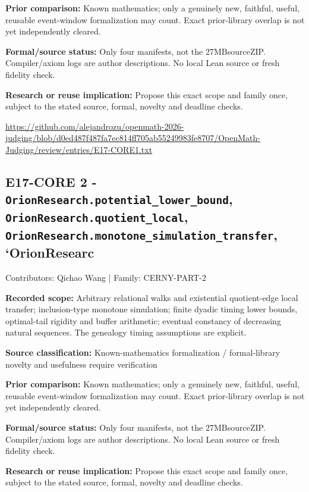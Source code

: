 \documentclass[11pt,a4paper]{article}
\begin{document}
\textbf{Prior comparison:} Known mathematics; only a genuinely new, faithful, useful, reusable event-window formalization may count. Exact prior-library overlap is not yet independently cleared.

\textbf{Formal/source status:} Only four manifests, not the 27MBsourceZIP. Compiler/axiom logs are author descriptions. No local Lean source or fresh fidelity check.

\textbf{Research or reuse implication:} Propose this exact scope and family once, subject to the stated source, formal, novelty and deadline checks.

{\small \url{https://github.com/alejandrozu/openmath-2026-judging/blob/d0ed487f487fa7ec814ff705ab55249983fe8707/OpenMath-Judging/review/entries/E17-CORE1.txt}\par}

\begin{samepage}
\subsection{E17-CORE 2  -  \texttt{OrionResearch.potential\_lower\_bound}, \texttt{OrionResearch.quotient\_local}, \texttt{OrionResearch.monotone\_simulation\_transfer}, `OrionResearc}
{\small Contributors: Qichao Wang | Family: CERNY-PART-2\par}

\textbf{Recorded scope:} Arbitrary relational walks and existential quotient-edge local transfer; inclusion-type monotone simulation; finite dyadic timing lower bounds, optimal-tail rigidity and buffer arithmetic; eventual constancy of decreasing natural sequences. The genealogy timing assumptions are explicit.

\end{samepage}
\textbf{Source classification:} Known-mathematics formalization / formal-library novelty and usefulness require verification

\textbf{Prior comparison:} Known mathematics; only a genuinely new, faithful, useful, reusable event-window formalization may count. Exact prior-library overlap is not yet independently cleared.

\textbf{Formal/source status:} Only four manifests, not the 27MBsourceZIP. Compiler/axiom logs are author descriptions. No local Lean source or fresh fidelity check.

\textbf{Research or reuse implication:} Propose this exact scope and family once, subject to the stated source, formal, novelty and deadline checks.
\end{document}
